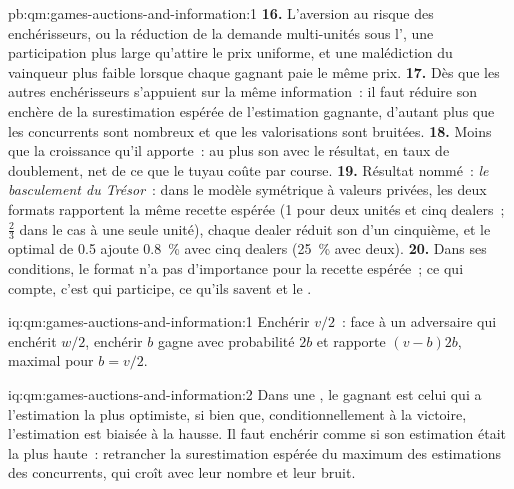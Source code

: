 \begin{solution}{pb:qm:games-auctions-and-information:1}
\textbf{16.} L'aversion au risque des enchérisseurs, ou la réduction de la demande multi-unités sous l', une participation plus large qu'attire le prix uniforme, et une malédiction du vainqueur plus faible lorsque chaque gagnant paie le même prix.
\textbf{17.} Dès que les autres enchérisseurs s'appuient sur la même information~: il faut réduire son enchère de la surestimation espérée de l'estimation gagnante, d'autant plus que les concurrents sont nombreux et que les valorisations sont bruitées.
\textbf{18.} Moins que la croissance qu'il apporte~: au plus son  avec le résultat, en taux de doublement, net de ce que le tuyau coûte par course.
\textbf{19.} Résultat nommé~: \emph{le basculement du Trésor}~: dans le modèle symétrique à valeurs privées, les deux formats rapportent la même recette espérée (1 pour deux unités et cinq dealers~; $\frac23$ dans le cas à une seule unité), chaque dealer
réduit son  d'un cinquième, et le  optimal de 0.5 ajoute 0.8~\% avec cinq dealers (25~\% avec deux).
\textbf{20.} Dans ses conditions, le format n'a pas d'importance pour la recette espérée~; ce qui compte, c'est qui participe, ce qu'ils savent et le .
\end{solution}

\begin{solution}{iq:qm:games-auctions-and-information:1}
Enchérir $v/2$~: face à un adversaire qui enchérit $w/2$, enchérir $b$ gagne avec probabilité $2b$ et rapporte $(v - b)2b$, maximal pour $b = v/2$.
\end{solution}

\begin{solution}{iq:qm:games-auctions-and-information:2}
Dans une , le gagnant est celui qui a l'estimation la plus optimiste, si bien que, conditionnellement à la victoire, l'estimation est biaisée à la hausse. Il faut enchérir comme si son estimation était la plus haute~: retrancher la
surestimation espérée du maximum des estimations des concurrents, qui croît avec leur nombre et leur bruit.
\end{solution}

